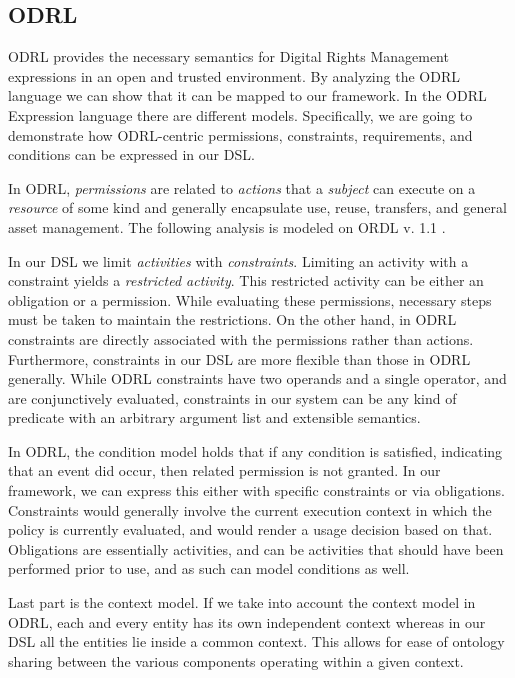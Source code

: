 \subsection{ODRL}\label{sec:model-odrl}
ODRL provides the necessary semantics for Digital Rights Management expressions in an open and trusted environment. By analyzing the ODRL language we can show that it can be mapped to our framework. In the ODRL Expression language there are different models.  Specifically, we are going to demonstrate how ODRL-centric permissions, constraints, requirements, and conditions can be expressed in our DSL.

In ODRL, \emph{permissions} are related to \emph{actions} that a \emph{subject} can execute on a \emph{resource} of some kind and generally encapsulate use, reuse, transfers, and general asset management.  The following analysis is modeled on ORDL v. 1.1 \cite{Ia:02}.

In our DSL we limit \emph{activities} with \emph{constraints}. Limiting an activity with a constraint yields a \emph{restricted activity}. This restricted activity can be either an obligation or a permission. While evaluating these permissions, necessary steps must be taken to maintain the restrictions. On the other hand, in ODRL constraints are directly associated with the permissions rather than actions.  Furthermore, constraints in our DSL are more flexible than those in ODRL generally. While ODRL constraints have two operands and a single operator, and are conjunctively evaluated, constraints in our system can be any kind of predicate with an arbitrary argument list and extensible semantics.

In ODRL, the condition model holds that if any condition is satisfied, indicating that an event did occur, then related permission is not granted. In our framework, we can express this either with specific constraints or via obligations.  Constraints would generally involve the current execution context in which the policy is currently evaluated, and would render a usage decision based on that.  Obligations are essentially activities, and can be activities that should have been performed prior to use, and as such can model conditions as well.

Last part is the context model. If we take into account the context model in ODRL, each and every entity has its own independent context whereas in our DSL all the entities lie inside a common context.  This allows for ease of ontology sharing between the various components operating within a given context.

